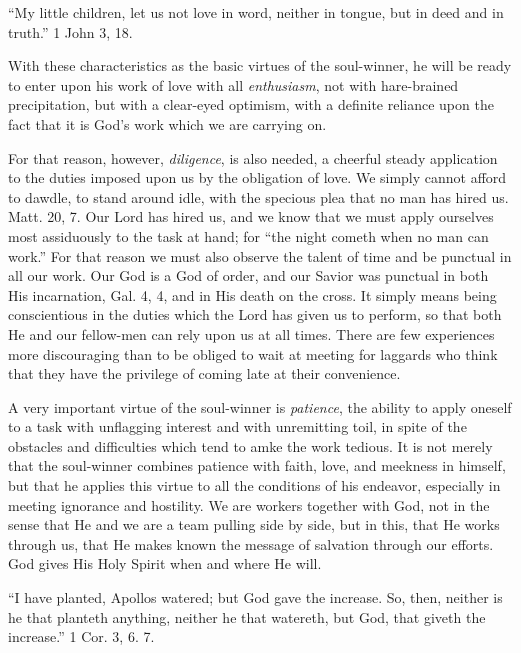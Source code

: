 \documentclass[
]{book}
\begin{document}
``My little children, let us not love in word, neither in tongue, but in deed and in truth.'' 1 John 3, 18.

With these characteristics as the basic virtues of the soul-winner, he will be ready to enter upon his work of love with all \emph{enthusiasm}, not with hare-brained precipitation, but with a clear-eyed optimism, with a definite reliance upon the fact that it is God's work which we are carrying on.

For that reason, however, \emph{diligence}, is also needed, a cheerful steady application to the duties imposed upon us by the obligation of love. We simply cannot afford to dawdle, to stand around idle, with the specious plea that no man has hired us. Matt. 20, 7. Our Lord has hired us, and we know that we must apply ourselves most assiduously to the task at hand; for ``the night cometh when no man can work.'' For that reason we must also observe the talent of time and be punctual in all our work. Our God is a God of order, and our Savior was punctual in both His incarnation, Gal. 4, 4, and in His death on the cross. It simply means being conscientious in the duties which the Lord has given us to perform, so that both He and our fellow-men can rely upon us at all times. There are few experiences more discouraging than to be obliged to wait at meeting for laggards who think that they have the privilege of coming late at their convenience.

A very important virtue of the soul-winner is \emph{patience}, the ability to apply oneself to a task with unflagging interest and with unremitting toil, in spite of the obstacles and difficulties which tend to amke the work tedious. It is not merely that the soul-winner combines patience with faith, love, and meekness in himself, but that he applies this virtue to all the conditions of his endeavor, especially in meeting ignorance and hostility. We are workers together with God, not in the sense that He and we are a team pulling side by side, but in this, that He works through us, that He makes known the message of salvation through our efforts. God gives His Holy Spirit when and where He will.

``I have planted, Apollos watered; but God gave the increase. So, then, neither is he that planteth anything, neither he that watereth, but God, that giveth the increase.'' 1 Cor. 3, 6. 7.
\end{document}
